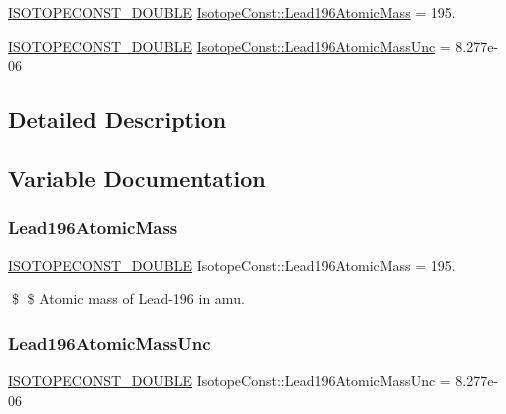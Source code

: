 \begin{DoxyCompactItemize}
\item 
\mbox{\hyperlink{group___isotope_const-_macros_ga8f45a7272ce02c0b4c65c44636ed719a}{I\+S\+O\+T\+O\+P\+E\+C\+O\+N\+S\+T\+\_\+\+D\+O\+U\+B\+LE}} \mbox{\hyperlink{group___isotope_const-_lead-_pb196_ga1cbf957c9c1c6a58861928972e9e108e}{Isotope\+Const\+::\+Lead196\+Atomic\+Mass}} = 195.
\item 
\mbox{\hyperlink{group___isotope_const-_macros_ga8f45a7272ce02c0b4c65c44636ed719a}{I\+S\+O\+T\+O\+P\+E\+C\+O\+N\+S\+T\+\_\+\+D\+O\+U\+B\+LE}} \mbox{\hyperlink{group___isotope_const-_lead-_pb196_gadf3860b013c6fda84d369a043cab52bb}{Isotope\+Const\+::\+Lead196\+Atomic\+Mass\+Unc}} = 8.\+277e-\/06
\end{DoxyCompactItemize}


\subsection{Detailed Description}


\subsection{Variable Documentation}
\mbox{\label{group___isotope_const-_lead-_pb196_ga1cbf957c9c1c6a58861928972e9e108e}} 
\subsubsection{\texorpdfstring{Lead196\+Atomic\+Mass}{Lead196AtomicMass}}
{\footnotesize\ttfamily \mbox{\hyperlink{group___isotope_const-_macros_ga8f45a7272ce02c0b4c65c44636ed719a}{I\+S\+O\+T\+O\+P\+E\+C\+O\+N\+S\+T\+\_\+\+D\+O\+U\+B\+LE}} Isotope\+Const\+::\+Lead196\+Atomic\+Mass = 195.}

\$ \$ Atomic mass of Lead-\/196 in amu. \mbox{\label{group___isotope_const-_lead-_pb196_gadf3860b013c6fda84d369a043cab52bb}} 
\subsubsection{\texorpdfstring{Lead196\+Atomic\+Mass\+Unc}{Lead196AtomicMassUnc}}
{\footnotesize\ttfamily \mbox{\hyperlink{group___isotope_const-_macros_ga8f45a7272ce02c0b4c65c44636ed719a}{I\+S\+O\+T\+O\+P\+E\+C\+O\+N\+S\+T\+\_\+\+D\+O\+U\+B\+LE}} Isotope\+Const\+::\+Lead196\+Atomic\+Mass\+Unc = 8.\+277e-\/06}

